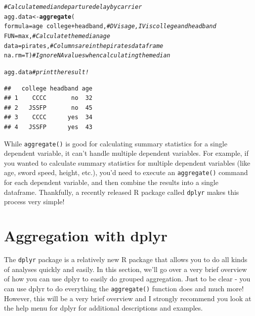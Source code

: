 \documentclass{tufte-book}\usepackage[]{graphicx}\usepackage[]{color}
\makeatletter
\newcommand{\hlcom}[1]{\textcolor[rgb]{0.678,0.584,0.686}{\textit{#1}}}%
\newcommand{\hlopt}[1]{\textcolor[rgb]{0,0,0}{#1}}%
\newcommand{\hlstd}[1]{\textcolor[rgb]{0.345,0.345,0.345}{#1}}%
\newcommand{\hlkwb}[1]{\textcolor[rgb]{0.69,0.353,0.396}{#1}}%
\newcommand{\hlkwc}[1]{\textcolor[rgb]{0.333,0.667,0.333}{#1}}%
\newcommand{\hlkwd}[1]{\textcolor[rgb]{0.737,0.353,0.396}{\textbf{#1}}}%
\newenvironment{kframe}{%
 \def\at@end@of@kframe{}%
 \ifinner\ifhmode%
  \def\at@end@of@kframe{\end{minipage}}%
  \begin{minipage}{\columnwidth}%
 \fi\fi%
 \def\FrameCommand##1{\hskip\@totalleftmargin \hskip-\fboxsep
 \colorbox{shadecolor}{##1}\hskip-\fboxsep
     \hskip-\linewidth \hskip-\@totalleftmargin \hskip\columnwidth}%
 \MakeFramed {\advance\hsize-\width
   \@totalleftmargin\z@ \linewidth\hsize
   \@setminipage}}%
 {\par\unskip\endMakeFramed%
 \at@end@of@kframe}
\newenvironment{knitrout}{}{} %
\makeatother
\begin{document}
\begin{footnotesize}
\begin{knitrout}
\color{fgcolor}\begin{kframe}
\begin{alltt}
\hlcom{# Calculate median departure delay by carrier}
\hlstd{agg.data} \hlkwb{<-} \hlkwd{aggregate}\hlstd{(}
            \hlkwc{formula} \hlstd{= age} \hlopt{~} \hlstd{college} \hlopt{+} \hlstd{headband,} \hlcom{# DV is age, IV is college and headband}
            \hlkwc{FUN} \hlstd{= max,} \hlcom{# Calculate the median age}
            \hlkwc{data} \hlstd{= pirates,} \hlcom{# Columns are in the pirates dataframe}
            \hlkwc{na.rm} \hlstd{= T)} \hlcom{# Ignore NA values when calculating the median}

\hlstd{agg.data} \hlcom{# print the result!}
\end{alltt}
\begin{verbatim}
##   college headband age
## 1    CCCC       no  32
## 2   JSSFP       no  45
## 3    CCCC      yes  34
## 4   JSSFP      yes  43
\end{verbatim}
\end{kframe}
\end{knitrout}
\end{footnotesize}


While \texttt{aggregate()} is good for calculating summary statistics for a single dependent variable, it can't handle multiple dependent variables. For example, if you wanted to calculate summary statistics for multiple dependent variables (like age, sword speed, height, etc.), you'd need to execute an \texttt{aggregate()} command for each dependent variable, and then combine the results into a single dataframe. Thankfully, a recently released R package called \texttt{dplyr} makes this process very simple!

\section{Aggregation with dplyr}

The \texttt{dplyr} package is a relatively new R package that allows you to do all kinds of analyses quickly and easily. In this section, we'll go over a very brief overview of how you can use dplyr to easily do grouped aggregation. Just to be clear - you can use dplyr to do everything the \texttt{aggregate()} function does and much more! However, this will be a very brief overview and I strongly recommend you look at the help menu for dplyr for additional descriptions and examples.
\end{document}
